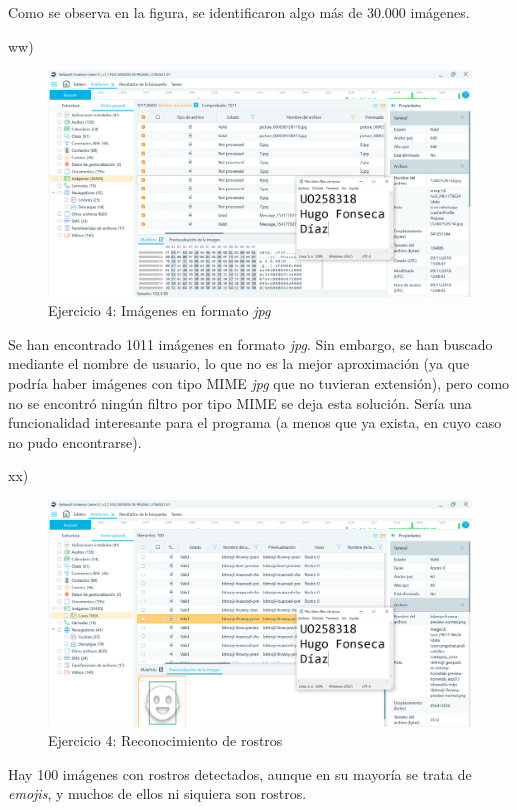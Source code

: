 \documentclass[11pt]{article}
\begin{document}
Como se observa en la figura, se identificaron algo más de 30.000 imágenes.

ww)

\begin{figure}[H]
    \caption{Ejercicio 4: Imágenes en formato \textit{jpg}}
    \centering
    \includegraphics[scale=0.4]{p04/e7-14.PNG}
\end{figure}

Se han encontrado 1011 imágenes en formato \textit{jpg}. Sin embargo, se han buscado mediante el nombre de usuario, lo que no es la mejor aproximación (ya que podría haber imágenes con tipo MIME \textit{jpg} que no tuvieran extensión), pero como no se encontró ningún filtro por tipo MIME se deja esta solución. Sería una funcionalidad interesante para el programa (a menos que ya exista, en cuyo caso no pudo encontrarse).

xx)

\begin{figure}[H]
    \caption{Ejercicio 4: Reconocimiento de rostros}
    \centering
    \includegraphics[scale=0.4]{p04/e7-15.PNG}
\end{figure}

Hay 100 imágenes con rostros detectados, aunque en su mayoría se trata de \textit{emojis}, y muchos de ellos ni siquiera son rostros.
\end{document}
